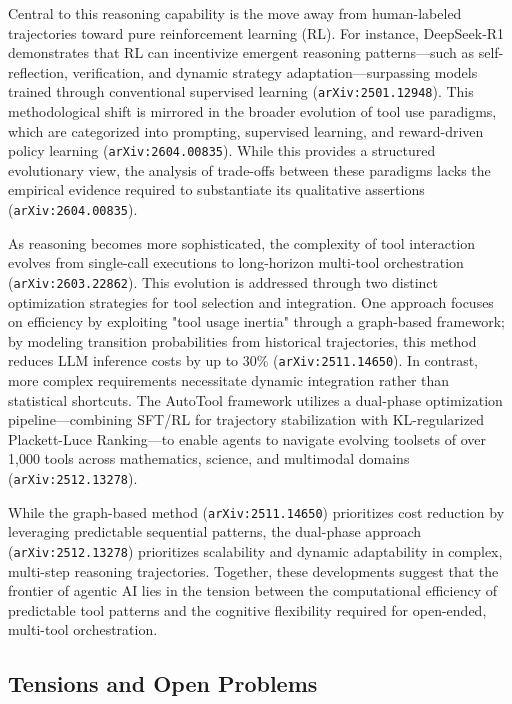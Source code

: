 \documentclass[11pt]{article}
\begin{document}
Central to this reasoning capability is the move away from human-labeled trajectories toward pure reinforcement learning (RL). For instance, DeepSeek-R1 demonstrates that RL can incentivize emergent reasoning patterns—such as self-reflection, verification, and dynamic strategy adaptation—surpassing models trained through conventional supervised learning (\texttt{arXiv:2501.12948}). This methodological shift is mirrored in the broader evolution of tool use paradigms, which are categorized into prompting, supervised learning, and reward-driven policy learning (\texttt{arXiv:2604.00835}). While this provides a structured evolutionary view, the analysis of trade-offs between these paradigms lacks the empirical evidence required to substantiate its qualitative assertions (\texttt{arXiv:2604.00835}).

As reasoning becomes more sophisticated, the complexity of tool interaction evolves from single-call executions to long-horizon multi-tool orchestration (\texttt{arXiv:2603.22862}). This evolution is addressed through two distinct optimization strategies for tool selection and integration. One approach focuses on efficiency by exploiting "tool usage inertia" through a graph-based framework; by modeling transition probabilities from historical trajectories, this method reduces LLM inference costs by up to 30\% (\texttt{arXiv:2511.14650}). In contrast, more complex requirements necessitate dynamic integration rather than statistical shortcuts. The AutoTool framework utilizes a dual-phase optimization pipeline—combining SFT/RL for trajectory stabilization with KL-regularized Plackett-Luce Ranking—to enable agents to navigate evolving toolsets of over 1,000 tools across mathematics, science, and multimodal domains (\texttt{arXiv:2512.13278}).

While the graph-based method (\texttt{arXiv:2511.14650}) prioritizes cost reduction by leveraging predictable sequential patterns, the dual-phase approach (\texttt{arXiv:2512.13278}) prioritizes scalability and dynamic adaptability in complex, multi-step reasoning trajectories. Together, these developments suggest that the frontier of agentic AI lies in the tension between the computational efficiency of predictable tool patterns and the cognitive flexibility required for open-ended, multi-tool orchestration.

\subsection{Tensions and Open Problems}
\end{document}

